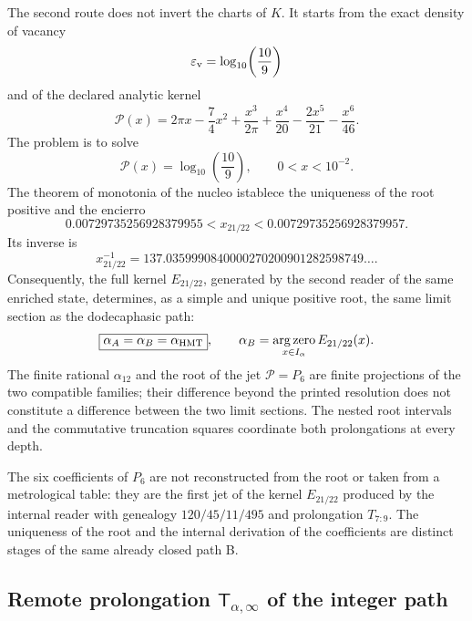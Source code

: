 The second route does not invert the charts of \(K\). It starts from the exact density
of vacancy
\[
 \varepsilon_{\rm v}=\log_{10}\!\left(\frac{10}{9}\right)
\]
and of the declared analytic kernel
\begin{equation}
 \mathcal P(x)
 =2\pi x-\frac74x^2+\frac{x^3}{2\pi}
  +\frac{x^4}{20}-\frac{2x^5}{21}-\frac{x^6}{46}.
 \label{eq:alpha-rev8-kernel-e21-22}
\end{equation}
The problem is to solve
\begin{equation}
 \mathcal P(x)=\log_{10}\!\left(\frac{10}{9}\right),
 \qquad 0<x<10^{-2}.
 \label{eq:alpha-rev8-ecuacion-e21-22}
\end{equation}
The theorem of monotonia of the nucleo istablece the uniqueness of the root positive
and the encierro
\[
 0.00729735256928379955
 <x_{21/22}<
 0.00729735256928379957.
\]
Its inverse is
\begin{equation}
 x_{21/22}^{-1}
 =137.0359990840000270200901282598749\ldots.
 \label{eq:alpha-rev8-inversa-e21-22}
\end{equation}
Consequently, the full kernel \(E_{21/22}\), generated by the second
reader of the same enriched state, determines, as a simple and
unique positive root, the same limit section as the dodecaphasic path:
\[
 \boxed{\alpha_A=\alpha_B=\alpha_{\rm HMT}},
 \qquad
 \alpha_B=\operatorname*{arg\,zero}_{x\in I_\alpha}E_{21/22}(x).
\]
The finite rational \(\alpha_{12}\) and the root of the jet \(\mathcal P=P_6\)
are finite projections of the two compatible families; their difference beyond
the printed resolution does not constitute a difference between the two
limit sections. The nested root intervals and the commutative
truncation squares coordinate both prolongations at every depth.

The six coefficients of \(P_6\) are not reconstructed from the root or taken
from a metrological table: they are the first jet of the kernel \(E_{21/22}\) produced
by the internal reader with genealogy \(120/45/11/495\) and prolongation
\(T_{7:9}\). The uniqueness of the root and the internal derivation of the
coefficients are distinct stages of the same already closed path B.

\subsection{Remote prolongation \texorpdfstring{\(\mathsf T_{\alpha,\infty}\)}{T alpha infinity} of the integer path}

